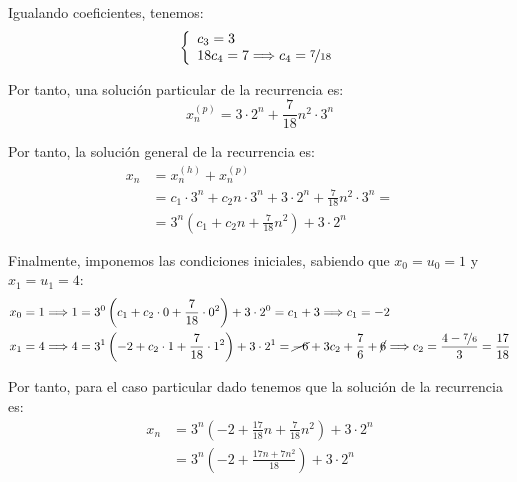 \begin{ejercicio}
    Igualando coeficientes, tenemos:
    \begin{equation*}
        \left\{\begin{array}{l}
            c_3 = 3 \\
            18c_4 = 7 \Longrightarrow c_4 = \nicefrac{7}{18}
        \end{array}\right.
    \end{equation*}

    Por tanto, una solución particular de la recurrencia es:
    \begin{equation*}
        x_n^{(p)} = 3\cdot 2^n + \frac{7}{18}n^2\cdot 3^n
    \end{equation*}

    Por tanto, la solución general de la recurrencia es:
    \begin{align*}
        x_n &= x_n^{(h)} + x_n^{(p)} \\&= c_1\cdot 3^n + c_2n\cdot 3^n + 3\cdot 2^n + \frac{7}{18}n^2\cdot 3^n=\\
        &= 3^n\left(c_1 + c_2n + \frac{7}{18}n^2\right) + 3\cdot 2^n
    \end{align*}

    Finalmente, imponemos las condiciones iniciales, sabiendo que $x_0=u_0=1$ y $x_1=u_1=4$:
    \begin{align*}
        x_0 = 1 &\Longrightarrow 1 = 3^0\left(c_1 + c_2\cdot 0 + \frac{7}{18}\cdot 0^2\right) + 3\cdot 2^0 = c_1 + 3 \Longrightarrow c_1 = -2\\
        x_1 = 4 &\Longrightarrow 4 = 3^1\left(-2 + c_2\cdot 1 + \frac{7}{18}\cdot 1^2\right) + 3\cdot 2^1 = \cancel{-6} + 3c_2 + \frac{7}{6} + \cancel{6} \Longrightarrow c_2 = \dfrac{4-\nicefrac{7}{6}}{3} = \dfrac{17}{18}
    \end{align*}

    Por tanto, para el caso particular dado tenemos que la solución de la recurrencia es:
    \begin{align*}
        x_n &= 3^n\left(-2 + \frac{17}{18}n + \frac{7}{18}n^2\right) + 3\cdot 2^n \\
        &= 3^n\left(-2 + \frac{17n + 7n^2}{18}\right) + 3\cdot 2^n
    \end{align*}
    


\end{ejercicio}